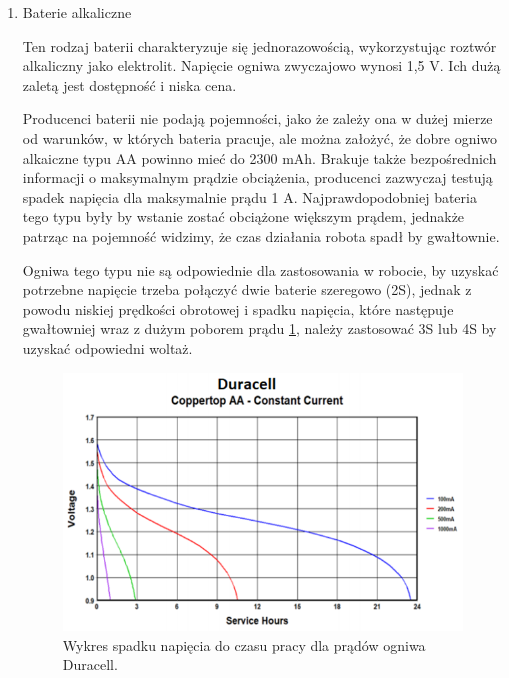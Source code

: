 \documentclass{report}
\begin{document}
\begin{enumerate}[label=(\Alph*)]
    \item Baterie alkaliczne

    Ten rodzaj baterii charakteryzuje się jednorazowością, wykorzystując roztwór alkaliczny jako elektrolit. Napięcie ogniwa zwyczajowo wynosi 1,5 V. Ich dużą zaletą jest dostępność i niska cena.
    
    Producenci baterii nie podają pojemności, jako że zależy ona w dużej mierze od warunków, w których bateria pracuje, ale można założyć, że dobre ogniwo alkaiczne typu AA powinno mieć do 2300 mAh. Brakuje także bezpośrednich informacji o maksymalnym prądzie obciążenia, producenci zazwyczaj testują spadek napięcia dla maksymalnie prądu 1 A. Najprawdopodobniej bateria tego typu były by wstanie zostać obciążone większym prądem, jednakże patrząc na pojemność widzimy, że czas działania robota spadł by gwałtownie.
    
    Ogniwa tego typu nie są odpowiednie dla zastosowania w robocie, by uzyskać potrzebne napięcie trzeba połączyć dwie baterie szeregowo (2S), jednak z powodu niskiej prędkości obrotowej i spadku napięcia, które następuje gwałtowniej wraz z dużym poborem prądu \ref{fig:duracell}, należy zastosować 3S lub 4S by uzyskać odpowiedni woltaż.
    
    \begin{figure}[H]
        \centering
        \includegraphics{src/cells_charts/Duracell discharge.png}
        \caption{Wykres spadku napięcia do czasu pracy dla prądów ogniwa Duracell.}
        \label{fig:duracell}
    \end{figure}


\end{enumerate}
\end{document}
